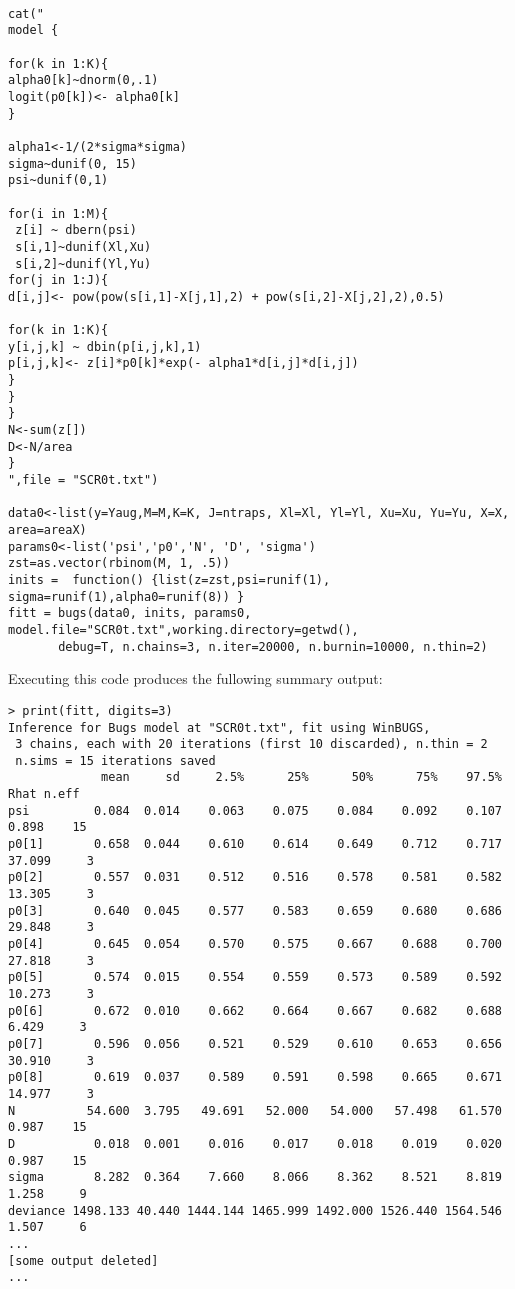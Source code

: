 {\small
\begin{verbatim}

cat("
model {

for(k in 1:K){
alpha0[k]~dnorm(0,.1)
logit(p0[k])<- alpha0[k]
}

alpha1<-1/(2*sigma*sigma)
sigma~dunif(0, 15)
psi~dunif(0,1)

for(i in 1:M){
 z[i] ~ dbern(psi)
 s[i,1]~dunif(Xl,Xu)
 s[i,2]~dunif(Yl,Yu)
for(j in 1:J){
d[i,j]<- pow(pow(s[i,1]-X[j,1],2) + pow(s[i,2]-X[j,2],2),0.5)

for(k in 1:K){
y[i,j,k] ~ dbin(p[i,j,k],1)
p[i,j,k]<- z[i]*p0[k]*exp(- alpha1*d[i,j]*d[i,j])
}
}
}
N<-sum(z[])
D<-N/area
}
",file = "SCR0t.txt")

data0<-list(y=Yaug,M=M,K=K, J=ntraps, Xl=Xl, Yl=Yl, Xu=Xu, Yu=Yu, X=X, area=areaX)
params0<-list('psi','p0','N', 'D', 'sigma')
zst=as.vector(rbinom(M, 1, .5))
inits =  function() {list(z=zst,psi=runif(1), sigma=runif(1),alpha0=runif(8)) }
fitt = bugs(data0, inits, params0, model.file="SCR0t.txt",working.directory=getwd(),    
       debug=T, n.chains=3, n.iter=20000, n.burnin=10000, n.thin=2)
\end{verbatim}
}

Executing this code produces the fullowing summary output:
{\small 
\begin{verbatim}
> print(fitt, digits=3)
Inference for Bugs model at "SCR0t.txt", fit using WinBUGS,
 3 chains, each with 20 iterations (first 10 discarded), n.thin = 2
 n.sims = 15 iterations saved
             mean     sd     2.5%      25%      50%      75%    97.5%   Rhat n.eff
psi         0.084  0.014    0.063    0.075    0.084    0.092    0.107  0.898    15
p0[1]       0.658  0.044    0.610    0.614    0.649    0.712    0.717 37.099     3
p0[2]       0.557  0.031    0.512    0.516    0.578    0.581    0.582 13.305     3
p0[3]       0.640  0.045    0.577    0.583    0.659    0.680    0.686 29.848     3
p0[4]       0.645  0.054    0.570    0.575    0.667    0.688    0.700 27.818     3
p0[5]       0.574  0.015    0.554    0.559    0.573    0.589    0.592 10.273     3
p0[6]       0.672  0.010    0.662    0.664    0.667    0.682    0.688  6.429     3
p0[7]       0.596  0.056    0.521    0.529    0.610    0.653    0.656 30.910     3
p0[8]       0.619  0.037    0.589    0.591    0.598    0.665    0.671 14.977     3
N          54.600  3.795   49.691   52.000   54.000   57.498   61.570  0.987    15
D           0.018  0.001    0.016    0.017    0.018    0.019    0.020  0.987    15
sigma       8.282  0.364    7.660    8.066    8.362    8.521    8.819  1.258     9
deviance 1498.133 40.440 1444.144 1465.999 1492.000 1526.440 1564.546  1.507     6
...
[some output deleted]
...
\end{verbatim}
}






